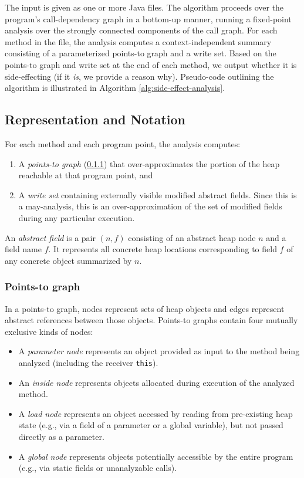 \documentclass{article}
\begin{document}
The input is given as one or more Java files. The algorithm proceeds over the program’s call-dependency graph in a bottom-up manner, running a fixed-point analysis over the strongly connected components of the call graph. For each method in the file, the analysis computes a context-independent summary consisting of a parameterized points-to graph and a write set. Based on the points-to graph and write set at the end of each method, we output whether it is side-effecting (if it \emph{is}, we provide a reason why). Pseudo-code outlining the algorithm is illustrated in Algorithm \ref{alg:side-effect-analysis}.



\subsection{Representation and Notation}\label{alg}

For each method and each program point, the analysis computes:

\begin{enumerate}
    \item A \emph{points-to graph} (\ref{PTG}) that over-approximates the portion of the heap reachable at that program point, and
    \item A \emph{write set} containing externally visible modified abstract fields. Since this is a may-analysis, this is an over-approximation of the set of modified fields during any particular execution.
\end{enumerate}

\noindent An \emph{abstract field} is a pair $(n,f)$ consisting of an abstract heap node $n$ and a field name $f$. It represents all concrete heap locations corresponding to field $f$ of any concrete object summarized by $n$.

\subsubsection{Points-to graph}\label{PTG}
In a points-to graph, nodes represent sets of heap objects and edges represent abstract references between those objects. Points-to graphs contain four mutually exclusive kinds of nodes:

\begin{itemize}
    \item A \emph{parameter node} represents an object provided as input to the method being analyzed (including the receiver \texttt{this}).
    \item An \emph{inside node} represents objects allocated during execution of the analyzed method.
    \item A \emph{load node} represents an object accessed by reading from pre-existing heap state (e.g., via a field of a parameter or a global variable), but not passed directly as a parameter.
    \item A \emph{global node} represents objects potentially accessible by the entire program (e.g., via static fields or unanalyzable calls).
\end{itemize}
\end{document}
